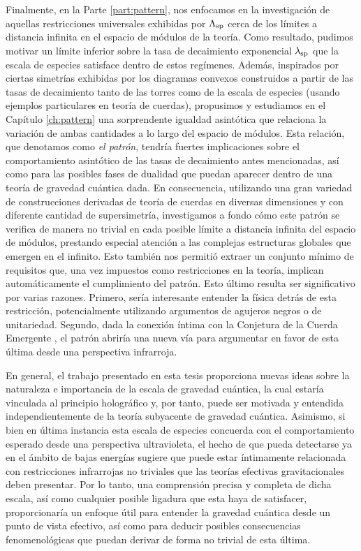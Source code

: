Finalmente, en la Parte \ref{part:pattern}, nos enfocamos en la investigación de aquellas restricciones universales exhibidas por $\Lambda_{\text{sp}}$ cerca de los límites a distancia infinita en el espacio de módulos de la teoría. Como resultado, pudimos motivar un límite inferior sobre la tasa de decaimiento exponencial $\lambda_{\rm sp}$ que la escala de especies satisface dentro de estos regímenes. Además, inspirados por ciertas simetrías exhibidas por los diagramas convexos construidos a partir de las tasas de decaimiento tanto de las torres como de la escala de especies (usando ejemplos particulares en teoría de cuerdas), propusimos y estudiamos en el Capítulo \ref{ch:pattern} una sorprendente igualdad asintótica que relaciona la variación de ambas cantidades a lo largo del espacio de módulos. Esta relación, que denotamos como \emph{el patrón}, tendría fuertes implicaciones sobre el comportamiento asintótico de las tasas de decaimiento antes mencionadas, así como para las posibles fases de dualidad que puedan aparecer dentro de una teoría de gravedad cuántica dada. En consecuencia, utilizando una gran variedad de construcciones derivadas de teoría de cuerdas en diversas dimensiones y con diferente cantidad de supersimetría, investigamos a fondo cómo este patrón se verifica de manera no trivial en cada posible límite a distancia infinita del espacio de módulos, prestando especial atención a las complejas estructuras globales que emergen en el infinito. Esto también nos permitió extraer un conjunto mínimo de requisitos que, una vez impuestos como restricciones en la teoría, implican automáticamente el cumplimiento del patrón. Esto último resulta ser significativo por varias razones. Primero, sería interesante entender la física detrás de esta restricción, potencialmente utilizando argumentos de agujeros negros o de unitariedad. Segundo, dada la conexión íntima con la Conjetura de la Cuerda Emergente \cite{Lee:2019wij}, el patrón abriría una nueva vía para argumentar en favor de esta última desde una perspectiva infrarroja.

En general, el trabajo presentado en esta tesis proporciona nuevas ideas sobre la naturaleza e importancia de la escala de gravedad cuántica, la cual estaría vinculada al principio holográfico y, por tanto, puede ser motivada y entendida independientemente de la teoría subyacente de gravedad cuántica. Asimismo, si bien en última instancia esta escala de especies concuerda con el comportamiento esperado desde una perspectiva ultravioleta, el hecho de que pueda detectarse ya en el ámbito de bajas energías sugiere que puede estar íntimamente relacionada con restricciones infrarrojas no triviales que las teorías efectivas gravitacionales deben presentar. Por lo tanto, una comprensión precisa y completa de dicha escala, así como cualquier posible ligadura que esta haya de satisfacer, proporcionaría un enfoque útil para entender la gravedad cuántica desde un punto de vista efectivo, así como para deducir posibles consecuencias fenomenológicas que puedan derivar de forma no trivial de esta última. 